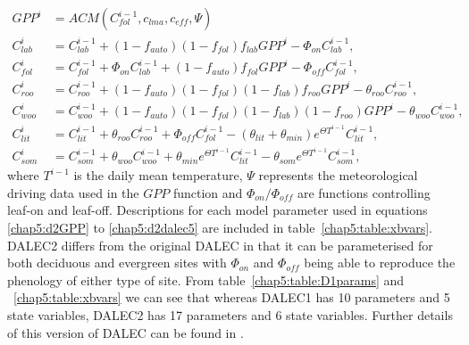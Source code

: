 \begin{align}
GPP^{i} &= ACM(C_{fol}^{i-1}, c_{lma}, c_{eff}, \Psi) \label{chap5:d2GPP}
\\C_{lab}^{i}&=C_{lab}^{i-1}+(1-f_{auto})(1-f_{fol})f_{lab}GPP^{i}-\Phi _{on}C_{lab}^{i-1}, \label{daleclab}
\\C_{fol}^{i}&=C_{fol}^{i-1}+\Phi_{on}C_{lab}^{i-1}+(1-f_{auto})f_{fol}GPP^{i}-\Phi_{off}C_{fol}^{i-1}, \label{dalec1}
\\C_{roo}^{i}&=C_{roo}^{i-1}+(1-f_{auto})(1-f_{fol})(1-f_{lab})f_{roo}GPP^{i}-\theta_{roo}C_{roo}^{i-1}, 
\\C_{woo}^{i}&=C_{woo}^{i-1}+(1-f_{auto})(1-f_{fol})(1-f_{lab})(1-f_{roo})GPP^{i}-\theta_{woo}C_{woo}^{i-1}, 
\\C_{lit}^{i}&=C_{lit}^{i-1}+\theta_{roo}C_{roo}^{i-1}+\Phi_{off}C_{fol}^{i-1}-(\theta_{lit}+\theta_{min})e^{\Theta T^{i-1}}C_{lit}^{i-1}, 
\\C_{som}^{i}&=C_{som}^{i-1}+\theta_{woo}C_{woo}^{i-1}+\theta_{min}e^{\Theta T^{i-1}}C_{lit}^{i-1}-\theta_{som}e^{\Theta T^{i-1}}C_{som}^{i-1}, \label{chap5:d2dalec5}
\end{align}
where $T^{i-1}$ is the daily mean temperature, $\Psi$ represents the meteorological driving data used in the $GPP$ function and $\Phi_{on} / \Phi_{off}$ are functions controlling leaf-on and leaf-off. Descriptions for each model parameter used in equations \eqref{chap5:d2GPP} to \eqref{chap5:d2dalec5} are included in table~\ref{chap5:table:xbvars}. DALEC2 differs from the original DALEC in that it can be parameterised for both deciduous and evergreen sites with $\Phi_{on}$ and $\Phi_{off}$ being able to reproduce the phenology of either type of site. From table~\ref{chap5:table:D1params} and ~\ref{chap5:table:xbvars} we can see that whereas DALEC1 has 10 parameters and 5 state variables, DALEC2 has 17 parameters and 6 state variables. Further details of this version of DALEC can be found in \cite{Bloom2015}. 

